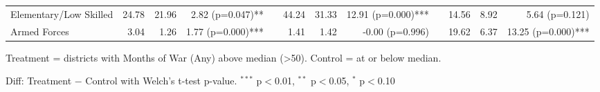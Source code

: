 \begin{table}[htbp]
\begin{tabular}{l rrr c rrr c rrr}
\quad Elementary/Low Skilled & 24.78 & 21.96 & 2.82 (p=0.047)** &  & 44.24 & 31.33 & 12.91 (p=0.000)*** &  & 14.56 & 8.92 & 5.64 (p=0.121) \\
\quad Armed Forces & 3.04 & 1.26 & 1.77 (p=0.000)*** &  & 1.41 & 1.42 & -0.00 (p=0.996) &  & 19.62 & 6.37 & 13.25 (p=0.000)*** \\
\bottomrule
\end{tabular}
\begin{tablenotes}
\small
\item Treatment = districts with Months of War (Any) above median (>50). Control = at or below median.
\item Diff: Treatment $-$ Control with Welch's t-test p-value. $^{{***}}$ p$<$0.01, $^{{**}}$ p$<$0.05, $^{{*}}$ p$<$0.10
\end{tablenotes}
\end{table}

\clearpage

